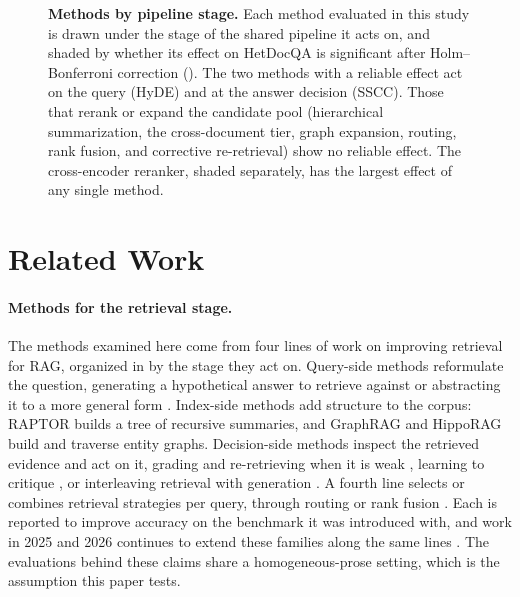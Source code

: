 \documentclass[10pt,twocolumn]{article}
\begin{document}
\begin{figure}[t]
\caption{\textbf{Methods by pipeline stage.} Each method evaluated in this
study is drawn under the stage of the shared pipeline it acts on, and shaded by
whether its effect on HetDocQA is significant after Holm--Bonferroni correction
(). The two methods with a reliable effect act on the query
(HyDE) and at the answer decision (SSCC). Those that rerank or expand the
candidate pool (hierarchical summarization, the cross-document tier, graph
expansion, routing, rank fusion, and corrective re-retrieval) show no reliable
effect. The cross-encoder reranker, shaded separately, has the largest effect of
any single method.}
\label{fig:principle}
\end{figure}

\section{Related Work}
\paragraph{Methods for the retrieval stage.}
The methods examined here come from four lines of work on improving retrieval
for RAG, organized in  by the stage they act on. Query-side
methods reformulate the question, generating a hypothetical answer to retrieve
against \cite{gao2023hyde,wang2023query2doc} or abstracting it to a more general
form \cite{zheng2024stepback}. Index-side methods add structure to the corpus:
RAPTOR \cite{sarthi2024raptor} builds a tree of recursive summaries, and GraphRAG
\cite{edge2024graphrag} and HippoRAG \cite{gutierrez2024hipporag} build and
traverse entity graphs. Decision-side methods inspect the retrieved evidence and
act on it, grading and re-retrieving when it is weak \cite{yan2024crag}, learning
to critique \cite{asai2024selfrag}, or interleaving retrieval with generation
\cite{jiang2023flare}. A fourth line selects or combines retrieval strategies per
query, through routing \cite{jeong2024adaptiverag} or rank fusion
\cite{cormack2009rrf}. Each is reported to improve accuracy on the benchmark it
was introduced with, and work in 2025 and 2026 continues to extend these families
along the same lines \cite{wang2025hypergraphrag,chen2025logicrag,%
shi2026reasoningtrees,zhang2025ragrouter,guo2025routerag,wang2025infogainrag,%
zhao2025parallelsearch}. The evaluations behind these claims share a
homogeneous-prose setting, which is the assumption this paper tests.
\end{document}
